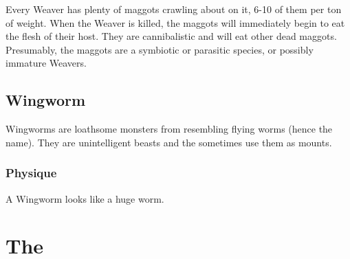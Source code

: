 Every Weaver has plenty of maggots crawling about on it, 6-10 of them per ton of weight. When the Weaver is killed, the maggots will immediately begin to eat the flesh of their host. They are cannibalistic and will eat other dead maggots. Presumably, the maggots are a symbiotic or parasitic species, or possibly immature Weavers. 















\section{Wingworm}
Wingworms are loathsome monsters from \Erebos resembling flying worms (hence the name). They are unintelligent beasts and the \banes{} sometimes use them as mounts. 









\subsection{Physique}
A Wingworm looks like a huge worm. 























\chapter{The \Resphain}


















